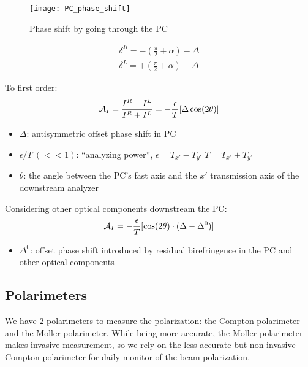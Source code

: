 \begin{figure}[h!]
    \texttt{[image: PC\_phase\_shift]}
    \caption{Phase shift by going through the PC}
\end{figure}

\begin{equation*}
    \begin{gathered}
	\delta^R = -\left(\frac{\pi}{2} + \alpha \right) - \Delta \\
	\delta^L = +\left(\frac{\pi}{2} + \alpha \right) - \Delta
    \end{gathered}
\end{equation*}

To first order:
\begin{equation*}
    \begin{gathered}
    \mathcal{A}_{I} = \frac{I^R - I^L}{I^R + I^L} = -\frac{\epsilon}{T}[\Delta\cos(2\theta)]	\\
    \end{gathered}
\end{equation*}
\bigskip
\begin{itemize}
    \item $\Delta$: antisymmetric offset phase shift in PC
    \item $\epsilon/T \ (<<1)$: ``analyzing power'', $\epsilon = T_{x'} - T_{y'}$ $T = T_{x'} + T_{y'}$
    \item $\theta$: the angle between the PC's fast axis and the $x'$ transmission axis of the downstream analyzer
\end{itemize}

Considering other optical components downstream the PC:
\begin{equation*}
    \mathcal{A}_{I} = -\frac{\epsilon}{T}[\cos(2\theta) \cdot (\Delta - \Delta^0)]
\end{equation*}
\begin{itemize}
    \item $\Delta^0$: offset phase shift introduced by residual birefringence in the PC and other optical components
\end{itemize}

\subsection{Polarimeters}
We have 2 polarimeters to measure the polarization: the Compton polarimeter and
the Moller polarimeter. While being more accurate, the Moller polarimeter makes
invasive measurement, so we rely on the less accurate but non-invasive Compton
polarimeter for daily monitor of the beam polarization.

